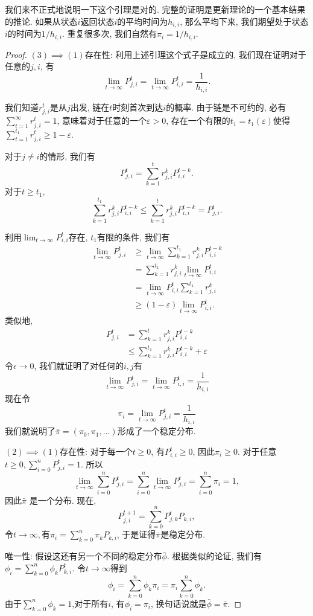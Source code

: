 我们来不正式地说明一下这个引理是对的. 完整的证明是更新理论的一个基本结果的推论. 如果从状态$i$返回状态$i$的平均时间为$h_{i,i}$, 那么平均下来, 我们期望处于状态$i$的时间为$1/h_{i,i}$. 重复很多次, 我们自然有$\pi_i = 1/h_{i,i}$. 

\begin{proof}
    $(3) \implies (1)$存在性: 利用上述引理这个式子是成立的, 我们现在证明对于任意的$j, i$, 有
    $$\lim _{t \rightarrow \infty} P_{j, i}^t=\lim _{t \rightarrow \infty} P_{i, i}^t=\frac{1}{h_{i, i}}.$$
    
    我们知道$r_{j, i}^t$是从$j$出发, 链在$t$时刻首次到达$i$的概率. 由于链是不可约的, 必有$\sum_{t=1}^{\infty} r_{j, i}^t=1$, 意味着对于任意的一个$\varepsilon>0$, 存在一个有限的$t_1=t_1(\varepsilon)$使得$\sum_{t=1}^{t_1} r_{j, i}^t \geq 1-\varepsilon$. 
    
    对于$j\neq i$的情形, 我们有
    $$P_{j, i}^t=\sum_{k=1}^t r_{j, i}^k P_{i, i}^{t-k}.$$ 
    对于$t\geq t_1$, $$\sum_{k=1}^{t_1} r_{j, i}^k P_{i, i}^{t-k} \leq \sum_{k=1}^t r_{j, i}^k P_{i, i}^{t-k}=P_{j, i}^t.$$
    
    利用$\lim _{t \rightarrow \infty} P_{i, i}^t$存在, $t_1$有限的条件, 我们有
    $$
    \begin{aligned}
    \lim _{t \rightarrow \infty} P_{j, i}^t & \geq \lim _{t \rightarrow \infty} \sum_{k=1}^{t_1} r_{j, i}^k P_{i, i}^{t-k} \\
    & =\sum_{k=1}^{t_1} r_{j, i}^k \lim _{t \rightarrow \infty} P_{i, i}^t \\
    & =\lim _{t \rightarrow \infty} P_{i, i}^t \sum_{k=1}^{t_1} r_{j, i}^k \\
    & \geq(1-\varepsilon) \lim _{t \rightarrow \infty} P_{i, i}^t .
    \end{aligned}
    $$
    类似地, 
    $$
    \begin{aligned}
    P_{j, i}^t & =\sum_{k=1}^t r_{j, i}^k P_{i, i}^{t-k} \\
    & \leq \sum_{k=1}^{t_1} r_{j, i}^k P_{i, i}^{t-k}+\varepsilon
    \end{aligned}
    $$
    令$\epsilon \to 0$, 我们就证明了对任何的$i, j$有
    $$
    \lim _{t \rightarrow \infty} P_{j, i}^t=\lim _{t \rightarrow \infty} P_{i, i}^t=\frac{1}{h_{i, i}}
    $$
    现在令
    $$
    \pi_i=\lim _{t \rightarrow \infty} P_{j, i}^t=\frac{1}{h_{i, i}}
    $$
    我们就说明了$\bar{\pi}=\left(\pi_0, \pi_1, \ldots\right)$形成了一个稳定分布. 

    $(2)\implies(1)$存在性: 对于每一个$t\geq 0$, 有$P_{i,i}^t\geq 0$, 因此$\pi_i\geq 0$. 对于任意$t \geq 0, \sum_{i=0}^n P_{j, i}^t=1$. 所以$$\lim _{t \rightarrow \infty} \sum_{i=0}^n P_{j, i}^t=\sum_{i=0}^n \lim _{t \rightarrow \infty} P_{j, i}^t=\sum_{i=0}^n \pi_i=1,$$因此$\bar \pi$ 是一个分布. 现在, $$P_{j, i}^{t+1}=\sum_{k=0}^n P_{j, k}^t P_{k, i},$$令$t\to \infty, $有$\pi_i=\sum_{k=0}^n \pi_k P_{k, i}$, 于是证得$\bar \pi$是稳定分布. 

    唯一性: 假设这还有另一个不同的稳定分布$\bar{\phi}$. 根据类似的论证, 我们有$\phi_i=\sum_{k=0}^n \phi_k P_{k, i}^t$. 令$t \rightarrow \infty$得到$$\phi_i=\sum_{k=0}^n \phi_k \pi_i=\pi_i \sum_{k=0}^n \phi_k.$$ 由于$\sum_{k=0}^n \phi_k=1$,对于所有$i$, 有$\phi_i=\pi_i$, 换句话说就是$\bar{\phi}=\bar{\pi}$.
\end{proof}

